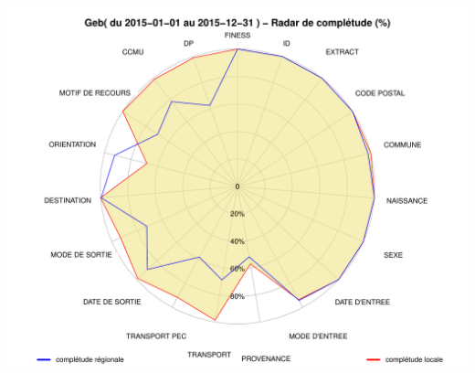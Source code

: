\documentclass[]{article}
\begin{document}
\includegraphics{completude_files/figure-latex/finess-11.pdf}
\end{document}
